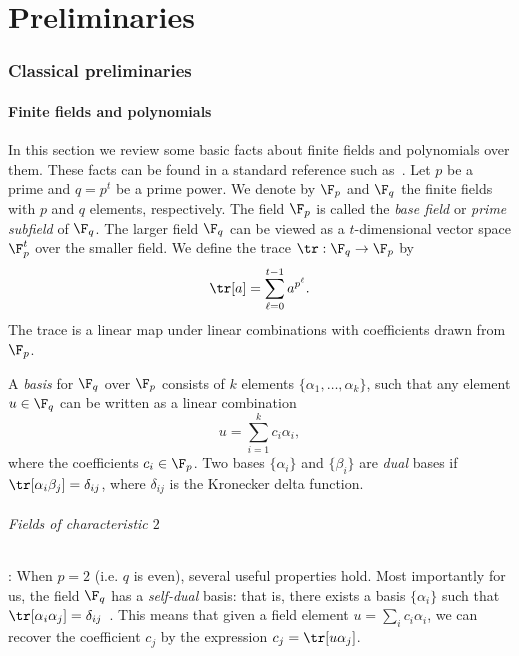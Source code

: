 \documentclass[11pt]{article}
\begin{document}






\part{Preliminaries}

\label{part:prelims}

\newcommand{\tstep}{\mathrm{twostep}}
\newcommand{\unif}{\mathrm{uniform}}
\newcommand{\tv}{\mathrm{TV}}
\renewcommand{\ol}{\overline}

\section{Classical preliminaries}  \label{sec:prelims}

\subsection{Finite fields and polynomials}
In this section we review some basic facts about finite fields and
polynomials over them. These facts can be found in a standard
reference such as~\cite{MBG+13}. Let $p$ be a prime and $q = p^t$ be a prime power. We denote by $\F_p$
and $\F_q$ the finite fields with $p$ and $q$ elements,
respectively. The field $\F_p$ is called the \emph{base field} or
\emph{prime subfield} of $\F_q$. The larger field $\F_q$ can be viewed as a
$t$-dimensional vector space $\F_p^{t}$ over the smaller field.
We define the trace $\tr: \F_q \to \F_p$ by
\[ \tr[a]  = \sum_{\ell=0}^{t-1} a^{p^\ell}. \]
The trace is a linear map under linear combinations with coefficients
drawn from $\F_p$. 

A \emph{basis} for
$\F_q$ over $\F_p$ consists of $k$ elements $\{\alpha_1, \dots,
\alpha_k\}$, such that any element $u \in \F_q$ can be written as a
linear combination
\[ u = \sum_{i=1}^k c_i \alpha_i, \]
where the coefficients $c_i \in \F_p$. Two bases $\{\alpha_i\}$ and
$\{\beta_i\}$ are \emph{dual} bases if $\tr[\alpha_i \beta_j]
= \delta_{ij}$, where $\delta_{ij}$ is the Kronecker delta function.

\paragraph{Fields of characteristic $2$}:
When $p =2$ (i.e. $q$ is even), several useful properties hold. Most
importantly for us, the field $\F_q$ has a \emph{self-dual} basis: that is, there exists a basis $\{\alpha_i\}$ such
that $\tr[\alpha_i \alpha_j] =
\delta_{ij}$~\cite[Theorem 1.9]{MBG+13}. This means that
given a field element $u = \sum_i c_i \alpha_i$, we can recover the
coefficient $c_j$ by the expression $c_j = \tr[u \alpha_j]$.
\end{document}
